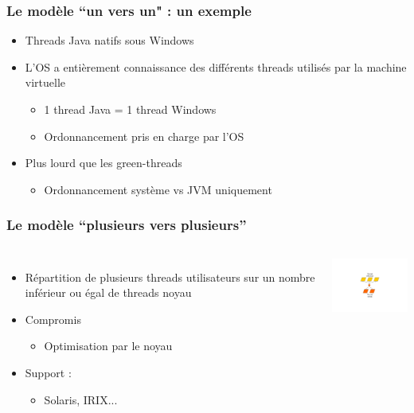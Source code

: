 \begin{frame}
 \frametitle{Le modèle ``un vers un" : un exemple}
 \begin{itemize}
 \item Threads Java natifs sous Windows
 \item L’OS a entièrement connaissance des différents threads utilisés par la machine virtuelle
 \begin{itemize}
 \item 1 thread Java = 1 thread Windows
 \item Ordonnancement pris en charge par l’OS
 \end{itemize}
 \item Plus lourd que les green-threads
 \begin{itemize}
 \item Ordonnancement système vs JVM uniquement
 \end{itemize}
 \end{itemize}
\end{frame}


\begin{frame}
 \frametitle{Le modèle ``plusieurs vers plusieurs''}
 \begin{columns}
 \begin{itemize}
 \item Répartition de plusieurs threads utilisateurs sur un nombre inférieur ou égal de threads noyau
 \item Compromis
 \begin{itemize}
 \item Optimisation par le noyau
 \end{itemize}
 \item Support :
 \begin{itemize}
 \item Solaris, IRIX...
 \end{itemize}
 \end{itemize}
 \includegraphics[width=4cm]{../illustration/threads-n-n.pdf}
 \end{columns}
\end{frame}


